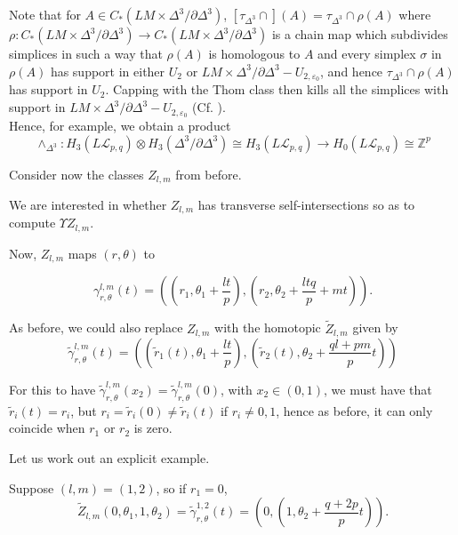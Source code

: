 \documentclass[reqno]{amsart}
\theoremstyle{definition}
\theoremstyle{remark}
\begin{document}
Note that for $A \in C_* \left( LM \times \Delta^3 / \partial \Delta^3
\right) $, $\left[ \tau_{\Delta^3} \cap \right] (A) = 
\tau_{\Delta^3} \cap \rho (A)$ where
$\rho \colon C_* \left( LM \times \Delta^3 / \partial \Delta^3 \right) 
\to C_* \left( LM \times \Delta^3 / \partial \Delta^3 \right) $ is a
chain map which subdivides simplices in such a way
that $\rho (A)$ is homologous to $A$ and every
simplex $\sigma$ in $\rho (A)$ has support
in either $U_2$ or $LM \times \Delta^3 / \partial \Delta^3 -
U_{2, \varepsilon_0}$, and hence
$\tau_{\Delta^3} \cap \rho (A)$ has support
in $U_{2}$.
Capping with the Thom class then kills all the simplices with support
in $LM \times \Delta^3 / \partial \Delta^3 - 
U_{2, \varepsilon_0}$ (Cf. \cite{Hingston-Wahl}).\\

Hence, for example, we obtain a product
\[
\wedge_{\Delta^3} \colon
H_{3}\left( L \mathcal{L}_{p,q} \right) 
\otimes H_3\left( \Delta^3 / \partial \Delta^3 \right) 
\cong H_3 \left( L \mathcal{L}_{p,q} \right) \to 
H_{0}\left( L \mathcal{L}_{p,q} \right) 
\cong \mathbb{Z}^{p}
\] 



Consider now the classes
$Z_{l,m}$ from before.

We are interested in whether $Z_{l,m}$ has transverse self-intersections
so as to compute
$\Upsilon Z_{l,m}$.

Now, $Z_{l,m}$ maps $\left( r, \theta \right) $ to

\[
    \gamma_{r,\theta}^{l,m}(t) =
    \left( \left( r_1, \theta_1 + \frac{lt}{p} \right) ,
    \left( r_2, \theta_2 + \frac{ltq}{p}+mt \right) \right) .
\] 

As before, we could also replace
$Z_{l,m}$ with
the homotopic $\tilde{Z}_{l,m}$ given by
\[
\tilde{\gamma}_{r, \theta}^{l,m}(t) = 
\left( \left( \tilde{r}_1 (t), \theta_1 + \frac{lt}{p} \right) ,
\left( \tilde{r}_2 (t), \theta_2 + \frac{ql+pm}{p} t \right) \right) 
\] 

For this to have
$\tilde{\gamma}_{r,\theta}^{l,m}(x_2) = \tilde{\gamma}_{r,\theta}^{l,m}(0)$,
with $x_2 \in (0,1)$,
we must have
that $\tilde{r}_i(t) = r_i$, but
$r_i = \tilde{r}_i(0) \neq \tilde{r}_i(t)$ if
$r_i \neq 0,1$,
hence as before, it can only coincide when
$r_1$ or $r_2$ is zero.

Let us work out an explicit example.

Suppose $\left( l,m \right) = (1,2)$, so if
$r_1 = 0$,
\[ 
    \tilde{Z}_{l,m}\left( 0,\theta_1, 1, \theta_2 \right) =
    \tilde{\gamma}_{r, \theta}^{1,2}
(t) = \left( 0 , \left(
1, \theta_2 + \frac{q+2p}{p}t \right) \right). \] 
\end{document}
